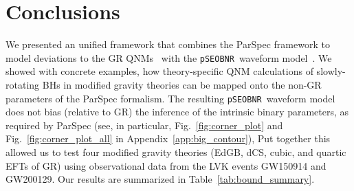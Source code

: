 \documentclass[twocolumn,
               prd,
               aps,
               superscriptaddress,
               tightenlines,
               nofootinbib,
               eqsecnum,
               amsfonts,
               amsmath,
               longbibliography]{revtex4-1}
\newcommand{\pSEOB}{\texttt{pSEOBNR}}
\begin{document}
%

\section{Conclusions}
\label{sec:conclusions}

We presented an unified framework that combines the ParSpec framework
to model deviations to the GR QNMs~\cite{Maselli:2019mjd} with the \pSEOB~waveform model~\cite{Brito:2018rfr,Ghosh:2021mrv}.
%
We showed with concrete examples, how theory-specific QNM calculations of
slowly-rotating BHs in modified gravity theories can be mapped onto the
non-GR parameters of the ParSpec formalism.
%
The resulting \pSEOB~waveform model does not bias (relative to GR) the inference of
the intrinsic binary parameters, as required by ParSpec (see, in particular, Fig.~\ref{fig:corner_plot} and
Fig.~\ref{fig:corner_plot_all} in Appendix~\ref{app:big_contour}),
%
Put together this allowed us to test four modified gravity theories (EdGB, dCS,
cubic, and quartic EFTs of GR) using observational data from the LVK events
GW150914 and GW200129. Our results are summarized in Table~\ref{tab:bound_summary}.
\end{document}
